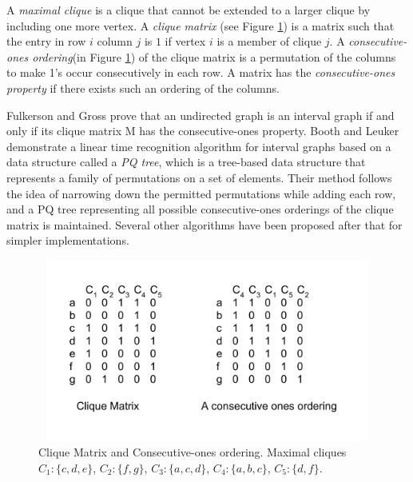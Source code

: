 A \emph{maximal clique} is a clique that cannot be extended to a larger clique by including one more vertex. A \emph{clique matrix} (see Figure \ref{cons_ones}) is a matrix such that the entry in row $i$ column $j$ is $1$ if vertex $i$ is a member of clique $j$. A \emph{consecutive-ones ordering}(in Figure \ref{cons_ones}) of the clique matrix is a permutation of the columns to make 1's occur consecutively in each row. A matrix has the \emph{consecutive-ones property} if there exists such an ordering of the columns.

Fulkerson and Gross\cite{fulkerson1965incidence} prove that an undirected graph is an interval graph if and only if its clique matrix M has the consecutive-ones property. Booth and Leuker\cite{booth1976testing} demonstrate a linear time recognition algorithm for interval graphs based on a data structure called a \emph{PQ tree}, which is a tree-based data structure that represents a family of permutations on a set of elements. Their method follows the idea of narrowing down the permitted permutations while adding each row, and a PQ tree representing all possible consecutive-ones orderings of the clique matrix is maintained. Several other algorithms\cite{corneil2009lbfs}\cite{habib2000lex}\cite{mcconnell2009linear} have been proposed after that for simpler implementations.

\begin{figure}[H]
\centering
\includegraphics[width=12cm,height=6cm]{figures/cons_ones.pdf}
\caption{Clique Matrix and Consecutive-ones ordering. Maximal cliques $C_1: \{c,d,e\}$, $C_2: \{f,g\}$, $C_3: \{a,c,d\}$, $C_4: \{a,b,c\}$, $C_5: \{d,f\}.$}
\label{cons_ones}
\end{figure}

